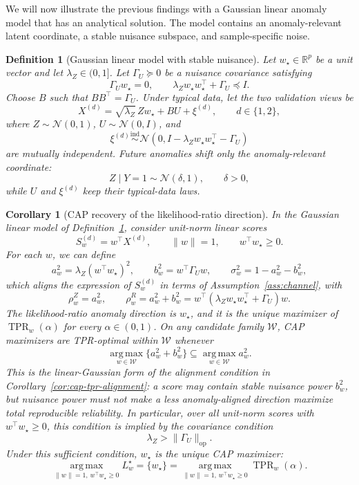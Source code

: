 \documentclass[11pt]{article}
\newtheorem{corollary}{Corollary}
\newtheorem{definition}{Definition}
\newcommand{\R}{\mathbb{R}}
\newcommand{\Normal}{\mathcal{N}}
\newcommand{\TPR}{\operatorname{TPR}}
\newcommand{\argmax}{\operatorname*{arg\,max}}
\begin{document}
We will now illustrate the previous findings with a Gaussian linear anomaly model
that has an analytical solution. The model
contains an anomaly-relevant latent coordinate, a stable nuisance subspace,
and sample-specific noise.

\begin{definition}[Gaussian linear model with stable nuisance]
\label{def:linear-gaussian}
Let \(w_\star\in\R^p\) be a unit vector and let
\(\lambda_Z\in(0,1]\). Let \(\Gamma_U\succeq0\) be a nuisance covariance
satisfying
\[
    \Gamma_U w_\star=0,
    \qquad
    \lambda_Z w_\star w_\star^\top+\Gamma_U\preceq I.
\]
Choose \(B\) such that \(BB^\top=\Gamma_U\). Under typical data, let the two
validation views be
\[
    X^{(d)}
    =
    \sqrt{\lambda_Z}\,Z w_\star
    +
    B U
    +
    \xi^{(d)},
    \qquad d\in\{1,2\},
\]
where \(Z\sim\Normal(0,1)\), \(U\sim\Normal(0,I)\), and
\[
    \xi^{(d)}
    \stackrel{\mathrm{ind}}{\sim}
    \Normal(0,I-\lambda_Z w_\star w_\star^\top-\Gamma_U)
\]
are mutually independent. Future anomalies shift only the anomaly-relevant
coordinate:
\[
    Z\mid Y=1\sim\Normal(\delta,1),
    \qquad \delta>0,
\]
while \(U\) and \(\xi^{(d)}\) keep their typical-data laws.
\end{definition}

\begin{corollary}[CAP recovery of the likelihood-ratio direction]
\label{cor:linear}
In the Gaussian linear model of Definition~\ref{def:linear-gaussian}, consider
unit-norm linear scores
\[
    S_w^{(d)}=w^\top X^{(d)},
    \qquad
    \|w\|=1,
    \qquad
    w^\top w_\star\ge0.
\]
For each \(w\), we can define
\[
    a_w^2=\lambda_Z(w^\top w_\star)^2,
    \qquad
    b_w^2=w^\top\Gamma_U w,
    \qquad
    \sigma_w^2=1-a_w^2-b_w^2,
\]
which aligns the expression of \(S_w^{(d)}\) in terms of Assumption~\ref{ass:channel}, with
\[
    \rho_w^Z=a_w^2,
    \qquad
    \rho_w^R=a_w^2+b_w^2
    =
    w^\top
    (\lambda_Z w_\star w_\star^\top+\Gamma_U)
    w .
\]
The likelihood-ratio anomaly direction is \(w_\star\), and it is the unique
maximizer of \(\TPR_w(\alpha)\) for every \(\alpha\in(0,1)\). On any candidate
family \(\mathcal W\), CAP maximizers are TPR-optimal within
\(\mathcal W\) whenever
\[
    \argmax_{w\in\mathcal W}\{a_w^2+b_w^2\}
    \subseteq
    \argmax_{w\in\mathcal W} a_w^2.
\]
This is the linear-Gaussian form of the alignment condition in
Corollary~\ref{cor:cap-tpr-alignment}: a score may contain stable nuisance
power \(b_w^2\), but nuisance power must not make a less anomaly-aligned
direction maximize total reproducible reliability. In particular, over all unit-norm scores with \(w^\top w_\star\ge0\), this
condition is implied by the covariance condition
\[
    \lambda_Z>\|\Gamma_U\|_{\mathrm{op}}.
\]
Under this sufficient condition, \(w_\star\) is the unique CAP maximizer:
\[
    \argmax_{\|w\|=1,\,w^\top w_\star\ge0}
    L_w^\star
    =
    \{w_\star\}
    =
    \argmax_{\|w\|=1,\,w^\top w_\star\ge0}
    \TPR_w(\alpha).
\]
\end{corollary}
\end{document}
